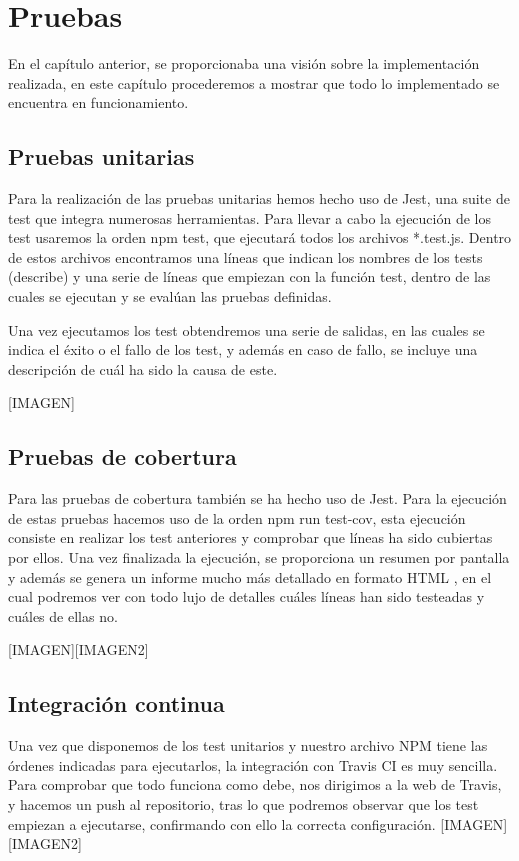 \chapter{Pruebas}

En el capítulo anterior, se proporcionaba una visión sobre la implementación realizada, en este capítulo procederemos a mostrar que todo lo implementado se encuentra en funcionamiento.

\section {Pruebas unitarias}
Para la realización de las pruebas unitarias hemos hecho uso de Jest, una suite de test que integra numerosas herramientas. Para llevar a cabo la ejecución de los test usaremos la orden npm test, que ejecutará todos los archivos *.test.js. Dentro de estos archivos encontramos una líneas que indican los nombres de los tests (describe) y una serie de líneas que empiezan con la función test, dentro de las cuales se ejecutan y se evalúan las pruebas definidas.

Una vez ejecutamos los test obtendremos una serie de salidas, en las cuales se indica el éxito o el fallo de los test, y además en caso de fallo, se incluye una descripción de cuál ha sido la causa de este.

[IMAGEN]
\section {Pruebas de cobertura}
Para las pruebas de cobertura también se ha hecho uso de Jest. Para la ejecución de estas pruebas hacemos uso de la orden npm run test-cov, esta ejecución consiste en realizar los test anteriores y comprobar que líneas ha sido cubiertas por ellos. Una vez finalizada la ejecución, se proporciona un resumen por pantalla y además se genera un informe mucho más detallado en formato HTML , en el cual podremos ver con todo lujo de detalles cuáles líneas han sido testeadas y cuáles de ellas no.

[IMAGEN][IMAGEN2]

\section {Integración continua}
Una vez que disponemos de los test unitarios y nuestro archivo NPM tiene las órdenes indicadas para ejecutarlos, la integración con Travis CI es muy sencilla. Para comprobar que todo funciona como debe, nos dirigimos a la web de Travis, y hacemos un push al repositorio, tras lo que podremos observar que los test empiezan a ejecutarse, confirmando con ello la correcta configuración.
[IMAGEN][IMAGEN2]

